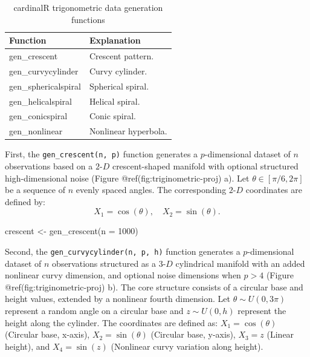 \documentclass[
  11pt,
  a4paper,
]{report}
\newenvironment{Shaded}{\begin{snugshade}}{\end{snugshade}}
\newcommand{\AttributeTok}[1]{\textcolor[rgb]{0.40,0.45,0.13}{#1}}
\newcommand{\DecValTok}[1]{\textcolor[rgb]{0.68,0.00,0.00}{#1}}
\newcommand{\FunctionTok}[1]{\textcolor[rgb]{0.28,0.35,0.67}{#1}}
\newcommand{\NormalTok}[1]{\textcolor[rgb]{0.00,0.23,0.31}{#1}}
\newcommand{\OtherTok}[1]{\textcolor[rgb]{0.00,0.23,0.31}{#1}}
\begin{document}
\begin{table}

\caption{\label{tab:trigonometric-tb-pdf}cardinalR trigonometric data generation functions}
\centering
\begin{tabular}[t]{>{\raggedright\arraybackslash}p{4cm}>{\raggedright\arraybackslash}p{8cm}}
\toprule
Function & Explanation\\
\midrule
gen\_crescent & Crescent pattern.\\
gen\_curvycylinder & Curvy cylinder.\\
gen\_sphericalspiral & Spherical spiral.\\
gen\_helicalspiral & Helical spiral.\\
gen\_conicspiral & Conic spiral.\\
gen\_nonlinear & Nonlinear hyperbola.\\
\bottomrule
\end{tabular}
\end{table}

First, the \texttt{gen\_crescent(n,\ p)} function generates a
\(p\)-dimensional dataset of \(n\) observations based on a
\(2\text{-}D\) crescent-shaped manifold with optional structured
high-dimensional noise (Figure @ref(fig:triginometric-proj) a). Let
\(\theta \in [\pi/6, 2\pi]\) be a sequence of \(n\) evenly spaced
angles. The corresponding \(2\text{-}D\) coordinates are defined by:
\[X_1 = \cos(\theta), \quad X_2 = \sin(\theta).\]

\begin{Shaded}
\begin{Highlighting}[]
\NormalTok{crescent }\OtherTok{\textless{}{-}} \FunctionTok{gen\_crescent}\NormalTok{(}\AttributeTok{n =} \DecValTok{1000}\NormalTok{)}
\end{Highlighting}
\end{Shaded}

Second, the \texttt{gen\_curvycylinder(n,\ p,\ h)} function generates a
\(p\)-dimensional dataset of \(n\) observations structured as a
\(3\text{-}D\) cylindrical manifold with an added nonlinear curvy
dimension, and optional noise dimensions when \(p > 4\) (Figure
@ref(fig:triginometric-proj) b). The core structure consists of a
circular base and height values, extended by a nonlinear fourth
dimension. Let \(\theta \sim U(0, 3\pi)\) represent a random angle on a
circular base and \(z \sim U(0, h)\) represent the height along the
cylinder. The coordinates are defined as: \(X_1 = \cos(\theta)\)
(Circular base, x-axis), \(X_2 = \sin(\theta)\) (Circular base, y-axis),
\(X_3 = z\) (Linear height), and \(X_4 = \sin(z)\) (Nonlinear curvy
variation along height).
\end{document}
